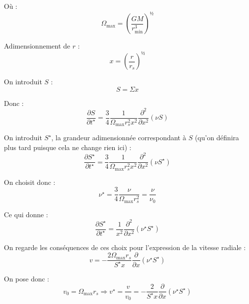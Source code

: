 Où :
\begin{equation}
    \Omega_\mathrm{max} = \left( \frac{G M}{r^3_\mathrm{min}} \right)^½
\end{equation}

Adimensionnement de $r$ :
\begin{equation}
    x = \left( \frac{r}{r_s} \right)^½
\end{equation}

On introduit $S$ :
\begin{equation}
    S = \Sigma x
\end{equation}

Donc :
\begin{equation}
    \frac{\partial S}{\partial t^\star} = \frac{3}{4} \frac{1}{\Omega_\mathrm{max} r_s^2 x^2} \frac{\partial^2}{\partial x^2} \left(\nu S\right)
\end{equation}

On introduit $S^\star$, la grandeur adimensionnée correspondant à $S$ (qu’on définira plus tard puisque cela ne change rien ici) :
\begin{equation}
    \frac{\partial S^\star}{\partial t^\star} = \frac{3}{4} \frac{1}{\Omega_\mathrm{max} r_s^2 x^2} \frac{\partial^2}{\partial x^2} \left(\nu S^\star\right)
\end{equation}

On choisit donc :
\begin{equation}
    \nu^\star = \frac{3}{4} \frac{\nu}{\Omega_\mathrm{max} r_s^2} = \frac{\nu}{\nu_0}
\end{equation}

Ce qui donne :
\begin{equation}
    \frac{\partial S^\star}{\partial t^\star} = \frac{1}{x^2} \frac{\partial^2}{\partial x^2} \left(\nu^\star S^\star\right)
\end{equation}

On regarde les conséquences de ces choix pour l’expression de la vitesse radiale :
\begin{equation}
    v = - \frac{2 \Omega_\mathrm{max} r_s}{S^\star x} \frac{\partial}{\partial x} \left(\nu^\star S^\star\right)
\end{equation}

On pose donc :
\begin{equation}
    v_0 = \Omega_\mathrm{max} r_s \Rightarrow v^\star = \frac{v}{v_0} = - \frac{2}{S^\star x} \frac{\partial}{\partial x} \left(\nu^\star S^\star\right)
\end{equation}

